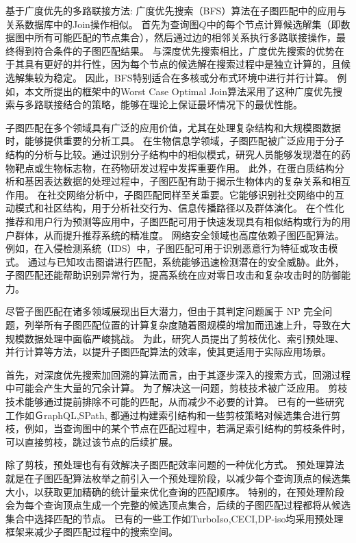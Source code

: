 基于广度优先的多路联接方法: 广度优先搜索（BFS）算法在子图匹配中的应用与关系数据库中的Join操作相似。
首先为查询图$Q$中的每个节点计算候选解集（即数据图中所有可能匹配的节点集合），然后通过边的相邻关系执行多路联接操作，最终得到符合条件的子图匹配结果。
与深度优先搜索相比，广度优先搜索的优势在于其具有更好的并行性，因为每个节点的候选解在搜索过程中是独立计算的，且候选解集较为稳定。
因此，BFS特别适合在多核或分布式环境中进行并行计算。
例如，本文所提出的框架中的Worst Case Optimal Join算法\cite{sm-bfs-DBLP:conf/focs/AtseriasGM08}采用了这种广度优先搜索与多路联接结合的策略，能够在理论上保证最坏情况下的最优性能。

子图匹配在多个领域具有广泛的应用价值，尤其在处理复杂结构和大规模图数据时，能够提供重要的分析工具。
在生物信息学领域，子图匹配被广泛应用于分子结构的分析与比较。通过识别分子结构中的相似模式，研究人员能够发现潜在的药物靶点或生物标志物，在药物研发过程中发挥重要作用。
此外，在蛋白质结构分析和基因表达数据的处理过程中，子图匹配有助于揭示生物体内的复杂关系和相互作用。
在社交网络分析中，子图匹配同样至关重要。它能够识别社交网络中的互动模式和社区结构，用于分析社交行为、信息传播路径以及群体演化。
在个性化推荐和用户行为预测等应用中，子图匹配可用于快速发现具有相似结构或行为的用户群体，从而提升推荐系统的精准度。
网络安全领域也高度依赖子图匹配算法。例如，在入侵检测系统（IDS）中，子图匹配可用于识别恶意行为特征或攻击模式。
通过与已知攻击图谱进行匹配，系统能够迅速检测潜在的安全威胁。此外，子图匹配还能帮助识别异常行为，提高系统在应对零日攻击和复杂攻击时的防御能力。

尽管子图匹配在诸多领域展现出巨大潜力，但由于其判定问题属于 NP 完全问题，列举所有子图匹配位置的计算复杂度随着图规模的增加而迅速上升，导致在大规模数据处理中面临严峻挑战。
为此，研究人员提出了剪枝优化、索引预处理、并行计算等方法，以提升子图匹配算法的效率，使其更适用于实际应用场景。

首先，对深度优先搜索加回溯的算法而言，由于其逐步深入的搜索方式，回溯过程中可能会产生大量的冗余计算。
为了解决这一问题，剪枝技术被广泛应用。
剪枝技术能够通过提前排除不可能的匹配，从而减少不必要的计算。
已有的一些研究工作如ＧraphQL\cite{sm-GraphQL-DBLP:series/ads/HeS10},SPath\cite{sm-spath-DBLP:journals/pvldb/ZhaoH10},
都通过构建索引结构和一些剪枝策略对候选集合进行剪枝，例如，当查询图中的某个节点在匹配过程中，若满足索引结构的剪枝条件时，可以直接剪枝，跳过该节点的后续扩展。

除了剪枝，预处理也有有效解决子图匹配效率问题的一种优化方式。 
预处理算法就是在子图匹配算法枚举之前引入一个预处理阶段，以减少每个查询顶点的候选集大小，以获取更加精确的统计量来优化查询的匹配顺序。
特别的，在预处理阶段会为每个查询顶点生成一个完整的候选顶点集合，后续的子图匹配过程都将从候选集合中选择匹配的节点。
已有的一些工作如TurboIso\cite{sm-turbo-iso-DBLP:conf/sigmod/HanLL13},CECI\cite{sm-ceci-DBLP:conf/sigmod/BhattaraiLH19},DP-iso\cite{sm-dp-iso-DBLP:conf/sigmod/HanKGPH19}均采用预处理框架来减少子图匹配过程中的搜索空间。

